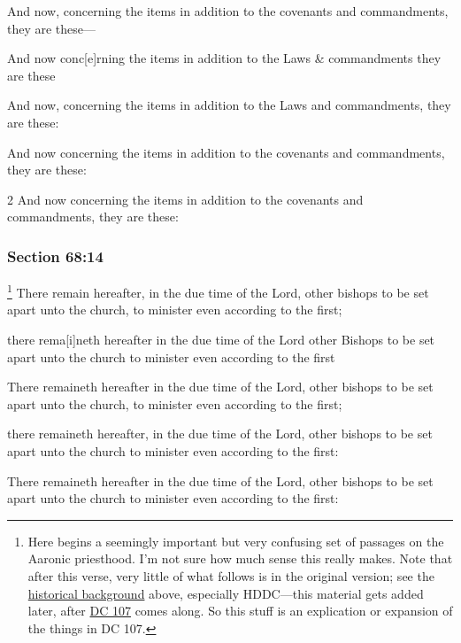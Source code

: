 		And now, concerning the items in addition to the covenants and commandments, they are these---

		\begin{framed}
		\scriptsize
			\begin{compactdesc}
				\item[JSP] And now conc[e]rning the items in addition to the Laws \& commandments they are these
				\item[EMS] And now, concerning the items in addition to the Laws and commandments, they are these:
				\item[EMS-R] And now concerning the items in addition to the covenants and commandments, they are these:
				\item[DC 1835] 2 And now concerning the items in addition to the covenants and commandments, they are these:
			\end{compactdesc}
		\end{framed}

	\subsubsection{Section 68:14} %
		\label{DC68-14}

			\footnote{%
				Here begins a seemingly important but very confusing set of passages on the Aaronic priesthood. I'm not sure how much sense this really makes. Note that after this verse, very little of what follows is in the original version; see the \hyperref[DC68-HB]{historical background} above, especially HDDC---this material gets added later, after \hyperref[DC107]{DC 107} comes along. So this stuff is an explication or expansion of the things in DC 107.
				}%
		There remain hereafter, in the due time of the Lord, other bishops to be set apart unto the church, to minister even according to the first;

		\begin{framed}
		\scriptsize
			\begin{compactdesc}
				\item[JSP] there rema[i]neth hereafter in the due time of the Lord other Bishops to be set apart unto the church to minister even according to the first
				\item[EMS] There remaineth hereafter in the due time of the Lord, other bishops to be set apart unto the church, to minister even according to the first; 
				\item[EMS-R] there remaineth hereafter, in the due time of the Lord, other bishops to be set apart unto the church to minister even according to the first:
				\item[DC 1835] There remaineth hereafter in the due time of the Lord, other bishops to be set apart unto the church to minister even according to the first:
			\end{compactdesc}
		\end{framed}

